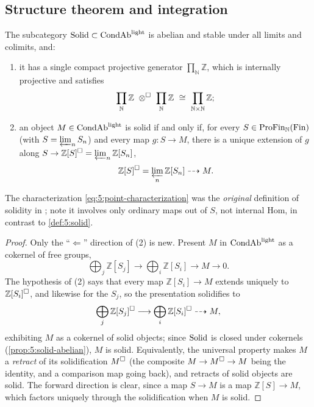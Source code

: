 \subsection{Structure theorem and integration}

\begin{theorem}
\label{thm:5:structure}
The subcategory $\mathrm{Solid}\subset\mathrm{CondAb}^{\mathrm{light}}$ is abelian and stable under all limits and
colimits, and:
\begin{enumerate}
\item it has a single compact projective generator $\prod_{\mathbb{N}}\mathbb{Z}$,
which is internally projective and satisfies
\begin{equation*}
\prod_{\mathbb{N}}\mathbb{Z}\ \otimes^{\solid}\ \prod_{\mathbb{N}}\mathbb{Z}
\ \cong\ \prod_{\mathbb{N}\times\mathbb{N}}\mathbb{Z};
\end{equation*}
\item an object $M\in\mathrm{CondAb}^{\mathrm{light}}$ is solid if and only if, for every $S\in
\mathrm{ProFin}_{\mathbb{N}}(\mathrm{Fin})$ (with $S=\varprojlim_n S_n$) and every map
$g\colon S\to M$, there is a unique extension of $g$ along
$S\to\mathbb{Z}[S]^{\square}=\varprojlim_{n}\mathbb{Z}[S_{n}]$,
\begin{equation}
\label{eq:5:point-characterization}
\mathbb{Z}[S]^{\square}=\varprojlim_{n}\mathbb{Z}[S_{n}]\dashrightarrow M .
\end{equation}
\end{enumerate}
\end{theorem}

The characterization \eqref{eq:5:point-characterization} was the \emph{original}
definition of solidity in \cite{scholze2019condensed}; note it involves only
ordinary maps out of $S$, not internal Hom, in contrast to \cref{def:5:solid}.

\begin{proof}
Only the ``$\Leftarrow$'' direction of (2) is new. Present $M$ in $\mathrm{CondAb}^{\mathrm{light}}$ as a
cokernel of free groups,
\begin{equation*}
\bigoplus_{j}\mathbb{Z}[S_{j}]\longrightarrow\bigoplus_{i}\mathbb{Z}[S_{i}]
\longrightarrow M\longrightarrow0 .
\end{equation*}
The hypothesis of (2) says that every map $\mathbb{Z}[S_{i}]\to M$ extends
uniquely to $\mathbb{Z}[S_{i}]^{\square}$, and likewise for the $S_{j}$, so the
presentation solidifies to
\[
\bigoplus_{j}\mathbb{Z}[S_{j}]^{\square}\longrightarrow
\bigoplus_{i}\mathbb{Z}[S_{i}]^{\square}\dashrightarrow M ,
\]
exhibiting $M$ as a cokernel of solid objects; since $\mathrm{Solid}$ is closed under
cokernels (\cref{prop:5:solid-abelian}), $M$ is solid. Equivalently, the universal
property makes $M$ a \emph{retract} of its solidification $M^{\square}$ (the
composite $M\to M^{\square}\to M$ being the identity, and a comparison map going
back), and retracts of solid objects are solid. The forward direction is clear,
since a map $S\to M$ is a map $\mathbb{Z}[S]\to M$, which factors uniquely through
the solidification when $M$ is solid.
\end{proof}

